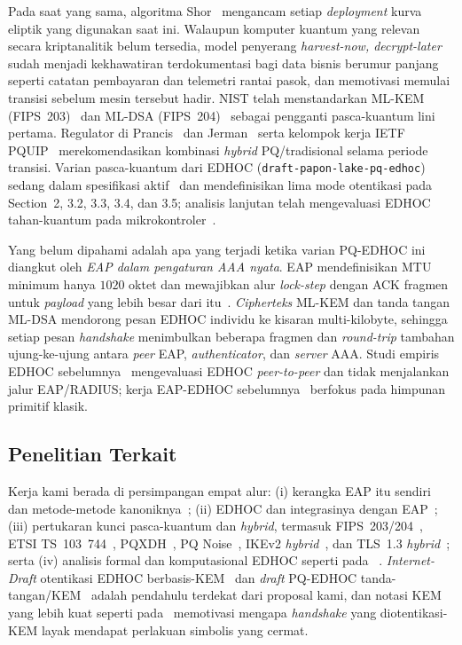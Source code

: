 \documentclass{easychair}
\begin{document}
Pada saat yang sama, algoritma Shor~\cite{shor1994algorithms}
mengancam setiap \emph{deployment} kurva eliptik yang digunakan saat
ini. Walaupun komputer kuantum yang relevan secara kriptanalitik
belum tersedia, model penyerang \emph{harvest-now, decrypt-later}
sudah menjadi kekhawatiran terdokumentasi bagi data bisnis berumur
panjang seperti catatan pembayaran dan telemetri rantai pasok, dan
memotivasi memulai transisi sebelum mesin tersebut hadir. NIST telah
menstandarkan ML-KEM (FIPS~203)~\cite{FIPS203} dan ML-DSA
(FIPS~204)~\cite{FIPS204} sebagai pengganti pasca-kuantum lini
pertama. Regulator di Prancis~\cite{ANSSI} dan
Jerman~\cite{TR-02102-1} serta kelompok kerja IETF
PQUIP~\cite{PQUIP} merekomendasikan kombinasi \emph{hybrid}
PQ/tradisional selama periode transisi. Varian pasca-kuantum dari
EDHOC (\texttt{draft-papon-lake-pq-edhoc}) sedang dalam spesifikasi
aktif~\cite{pq-edhoc-draft} dan mendefinisikan lima mode otentikasi
pada Section~2, 3.2, 3.3, 3.4, dan 3.5; analisis lanjutan telah
mengevaluasi EDHOC tahan-kuantum pada
mikrokontroler~\cite{FTK+25,FKF25}.

Yang belum dipahami adalah apa yang terjadi ketika varian PQ-EDHOC
ini diangkut oleh \emph{EAP dalam pengaturan AAA nyata}. EAP
mendefinisikan MTU minimum hanya $1020$ oktet dan mewajibkan alur
\emph{lock-step} dengan ACK fragmen untuk \emph{payload} yang lebih
besar dari itu~\cite{RFC3748,RFC9191}. \emph{Cipherteks} ML-KEM dan
tanda tangan ML-DSA mendorong pesan EDHOC individu ke kisaran
multi-kilobyte, sehingga setiap pesan \emph{handshake} menimbulkan
beberapa fragmen dan \emph{round-trip} tambahan ujung-ke-ujung
antara \emph{peer} EAP, \emph{authenticator}, dan \emph{server} AAA.
Studi empiris EDHOC sebelumnya~\cite{FVW24,FTK+25,FKF25} mengevaluasi
EDHOC \emph{peer-to-peer} dan tidak menjalankan jalur EAP/RADIUS;
kerja EAP-EDHOC sebelumnya~\cite{RFC-EAP-EDHOC,LopezGomez2026}
berfokus pada himpunan primitif klasik.

\subsection{Penelitian Terkait}
\label{sec:related-work}
Kerja kami berada di persimpangan empat alur: (i) kerangka EAP itu
sendiri dan metode-metode
kanoniknya~\cite{RFC3748,RFC5216,RFC4187,RFC4764}; (ii) EDHOC dan
integrasinya dengan EAP~\cite{RFC9528,RFC9529,LAKE,RFC-EAP-EDHOC,LopezGomez2026,FVW24};
(iii) pertukaran kunci pasca-kuantum dan \emph{hybrid}, termasuk
FIPS~203/204~\cite{FIPS203,FIPS204}, ETSI TS~103~744~\cite{TS103744},
PQXDH~\cite{PQXDH,FG24}, PQ Noise~\cite{ADH+22}, IKEv2
\emph{hybrid}~\cite{RFC9370}, dan TLS~1.3 \emph{hybrid}~\cite{TLS};
serta (iv) analisis formal dan komputasional EDHOC seperti pada
~\cite{KDL+21,NSB21,CP22,GM23,JKK+23,Fer24,PSM+24}.
\emph{Internet-Draft} otentikasi EDHOC berbasis-KEM~\cite{pocero} dan
\emph{draft} PQ-EDHOC tanda-tangan/KEM~\cite{pq-edhoc-draft} adalah
pendahulu terdekat dari proposal kami, dan notasi KEM yang lebih
kuat seperti pada~\cite{CDM24} memotivasi mengapa \emph{handshake}
yang diotentikasi-KEM layak mendapat perlakuan simbolis yang cermat.
\end{document}
